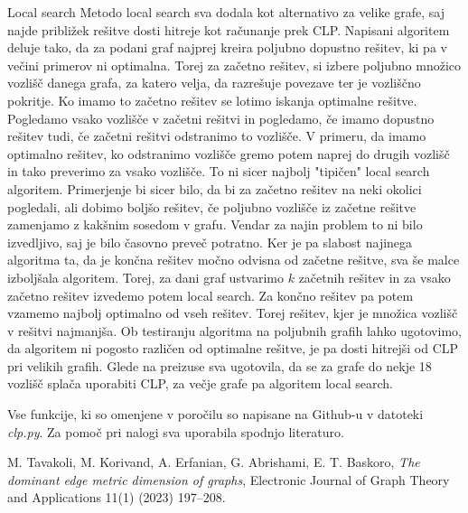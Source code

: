 \documentclass[12pt,a4paper]{amsart}
\makeatletter
\renewcommand\section{\@startsection{section}{1}%
  \z@{.5\linespacing\@plus.7\linespacing}{.5\linespacing}%
  {\normalfont\scshape\large\centering}}
\theoremstyle{plain} %
\makeatother
\begin{document}
\section{Local search}
    Metodo local search sva dodala kot alternativo za velike grafe, saj najde približek rešitve dosti hitreje kot 
    računanje prek CLP. Napisani algoritem deluje tako, da za podani graf najprej kreira poljubno dopustno rešitev, 
    ki pa v večini primerov ni optimalna. Torej za začetno rešitev, si izbere poljubno množico vozlišč danega grafa,
    za katero velja, da razrešuje povezave ter je vozliščno pokritje. Ko imamo to začetno rešitev se lotimo iskanja 
    optimalne rešitve. Pogledamo vsako vozlišče v začetni rešitvi in pogledamo, če imamo dopustno rešitev tudi, če 
    začetni rešitvi odstranimo to vozlišče. V primeru, da imamo optimalno rešitev, ko odstranimo vozlišče gremo potem 
    naprej do drugih vozlišč in tako preverimo za vsako vozlišče. To ni sicer najbolj "tipičen" local search algoritem.
    Primerjenje bi sicer bilo, da bi za začetno rešitev na neki okolici pogledali, ali dobimo boljšo rešitev, če poljubno
    vozlišče iz začetne rešitve zamenjamo z kakšnim sosedom v grafu. Vendar za najin problem to ni bilo izvedljivo, saj
    je bilo časovno preveč potratno. Ker je pa slabost najinega algoritma ta, da je končna rešitev močno odvisna od začetne
    rešitve, sva še malce izboljšala algoritem. Torej, za dani graf ustvarimo $k$ začetnih rešitev in za vsako začetno
    rešitev izvedemo potem local search. Za končno rešitev pa potem vzamemo najbolj optimalno od vseh rešitev. Torej
    rešitev, kjer je množica vozlišč v rešitvi najmanjša. Ob testiranju algoritma na poljubnih grafih lahko ugotovimo, 
    da algoritem ni pogosto različen od optimalne rešitve, je pa dosti hitrejši od CLP pri velikih grafih. 
    Glede na preizuse sva ugotovila, da se za grafe do nekje 18 vozlišč splača uporabiti CLP, za večje grafe pa algoritem local search.


\bigskip
Vse funkcije, ki so omenjene v poročilu so napisane na Github-u v datoteki \emph{clp.py}.
Za pomoč pri nalogi sva uporabila spodnjo literaturo.
\begin{thebibliography}{99}
    M. Tavakoli, M. Korivand, A. Erfanian, G. Abrishami, E. T. Baskoro,
    \emph{The dominant edge metric dimension of graphs},
    Electronic Journal of Graph Theory and Applications 11(1) (2023) 197–208.  
\end{thebibliography}
\end{document}
